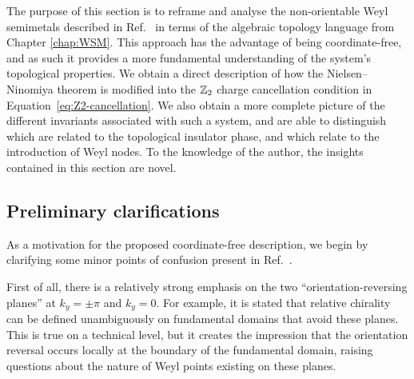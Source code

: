 

\label{sec:non-ori_topology}

The purpose of this section is to reframe and analyse the non-orientable Weyl semimetals described in Ref.~\cite{Fonseca-Vaidya_nonorientable} in terms of the algebraic topology language from Chapter \ref{chap:WSM}. This approach has the advantage of being coordinate-free, and as such it provides a more fundamental understanding of the system's topological properties. We obtain a direct description of how the Nielsen--Ninomiya theorem is modified into the $\mathbb{Z}_2$ charge cancellation condition in Equation~\eqref{eq:Z2-cancellation}. We also obtain a more complete picture of the different invariants associated with such a system, and are able to distinguish which are related to the topological insulator phase, and which relate to the introduction of Weyl nodes. To the knowledge of the author, the insights contained in this section are novel.

\subsection{Preliminary clarifications}

As a motivation for the proposed coordinate-free description, we begin by clarifying some minor points of confusion present in Ref.~\cite{Fonseca-Vaidya_nonorientable}.

First of all, there is a relatively strong emphasis on the two ``orientation-reversing planes'' at $k_y=\pm\pi$ and $k_y=0$. For example, it is stated that relative chirality can be defined unambiguously on fundamental domains that avoid these planes. This is true on a technical level, but it creates the impression that the orientation reversal occurs locally at the boundary of the fundamental domain, raising questions about the nature of Weyl points existing on these planes.

